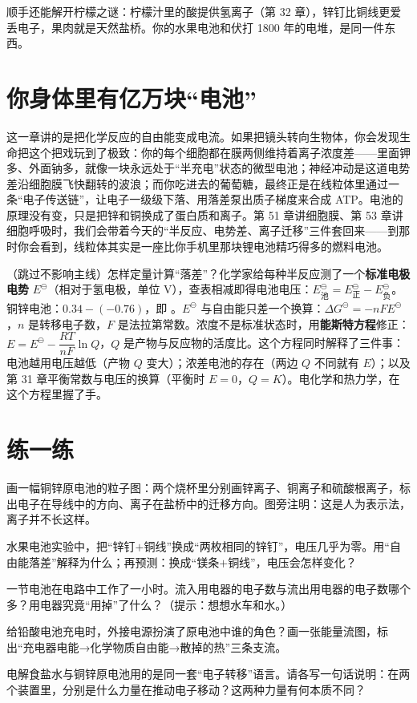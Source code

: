 顺手还能解开柠檬之谜：柠檬汁里的酸提供氢离子（第 32 章），锌钉比铜线更爱丢电子，果肉就是天然盐桥。你的水果电池和伏打 1800 年的电堆，是同一件东西。

\section{你身体里有亿万块“电池”}

这一章讲的是把化学反应的自由能变成电流。如果把镜头转向生物体，你会发现生命把这个把戏玩到了极致：你的每个细胞都在膜两侧维持着离子浓度差——里面钾多、外面钠多，就像一块永远处于“半充电”状态的微型电池；神经冲动是这道电势差沿细胞膜飞快翻转的波浪；而你吃进去的葡萄糖，最终正是在线粒体里通过一条“电子传送链”，让电子一级级下落、用落差泵出质子梯度来合成 ATP。电池的原理没有变，只是把锌和铜换成了蛋白质和离子。第 51 章讲细胞膜、第 53 章讲细胞呼吸时，我们会带着今天的“半反应、电势差、离子迁移”三件套回来——到那时你会看到，线粒体其实是一座比你手机里那块锂电池精巧得多的燃料电池。

\begin{tiaozhan}
（跳过不影响主线）怎样定量计算“落差”？化学家给每种半反应测了一个\textbf{标准电极电势} $E^{\ominus}$（相对于氢电极，单位 V），查表相减即得电池电压：$E^{\ominus}_{\text{池}} = E^{\ominus}_{\text{正}} - E^{\ominus}_{\text{负}}$。铜锌电池：$0.34-(-0.76)$，即 。$E^{\ominus}$ 与自由能只差一个换算：$\Delta G^{\ominus}=-nFE^{\ominus}$，$n$ 是转移电子数，$F$ 是法拉第常数。浓度不是标准状态时，用\textbf{能斯特方程}修正：$E = E^{\ominus} - \dfrac{RT}{nF}\ln Q$，$Q$ 是产物与反应物的活度比。这个方程同时解释了三件事：电池越用电压越低（产物 $Q$ 变大）；浓差电池的存在（两边 $Q$ 不同就有 $E$）；以及第 31 章平衡常数与电压的换算（平衡时 $E=0$，$Q=K$）。电化学和热力学，在这个方程里握了手。
\end{tiaozhan}

\section*{练一练}

\begin{sikaoti}
\item 画一幅铜锌原电池的粒子图：两个烧杯里分别画锌离子、铜离子和硫酸根离子，标出电子在导线中的方向、离子在盐桥中的迁移方向。图旁注明：这是人为表示法，离子并不长这样。
\item 水果电池实验中，把“锌钉$+$铜线”换成“两枚相同的锌钉”，电压几乎为零。用“自由能落差”解释为什么；再预测：换成“镁条$+$铜线”，电压会怎样变化？
\item 一节电池在电路中工作了一小时。流入用电器的电子数与流出用电器的电子数哪个多？用电器究竟“用掉”了什么？（提示：想想水车和水。）
\item 给铅酸电池充电时，外接电源扮演了原电池中谁的角色？画一张能量流图，标出“充电器电能→化学物质自由能→散掉的热”三条支流。
\item 电解食盐水与铜锌原电池用的是同一套“电子转移”语言。请各写一句话说明：在两个装置里，分别是什么力量在推动电子移动？这两种力量有何本质不同？
\end{sikaoti}
